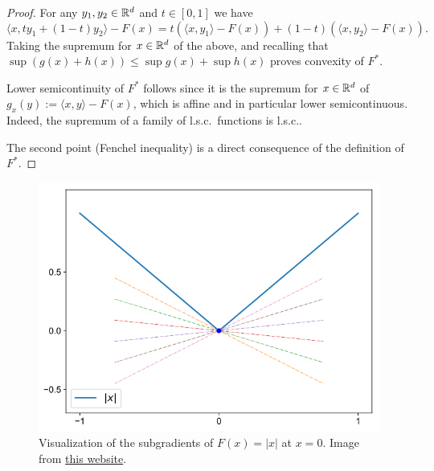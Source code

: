 \documentclass{report}
\begin{document}
\begin{proof}
	For any $y_1,y_2\in\mathbb{R}^d$ and $t\in[0,1]$ we have
	\begin{equation}
		\langle x, ty_1+(1-t)y_2 \rangle-F(x) = 
		t \left(\langle x, y_1\rangle-F(x)\right) + (1-t) \left(\langle x, y_2\rangle-F(x)\right).
	\end{equation}
	Taking the supremum for $x\in\mathbb{R}^d$ of the above, and recalling that $\sup(g(x)+h(x))\le \sup g(x)+\sup h(x)$ proves convexity of $F^*$. 

	Lower semicontinuity of $F^*$ follows since it is the supremum for $x\in\mathbb{R}^d$ of $g_x(y):=\langle x,y\rangle -F(x)$, which is affine and in particular lower semicontinuous. Indeed, the supremum of a family of l.s.c.~functions is l.s.c..

	The second point (Fenchel inequality) is a direct consequence of the definition of $F^*$.
\end{proof}






\begin{figure}
	\centering
	\includegraphics[width=.4\textwidth]{images/abs-subgrad.png}
	\caption{Visualization of the subgradients of $F(x)=|x|$ at $x=0$. Image from \href{https://tlienart.github.io/posts/2018/09/23-convex-optimisation-1/}{this website}.}
	\label{fig:subgrad-abs}
\end{figure}
\end{document}
